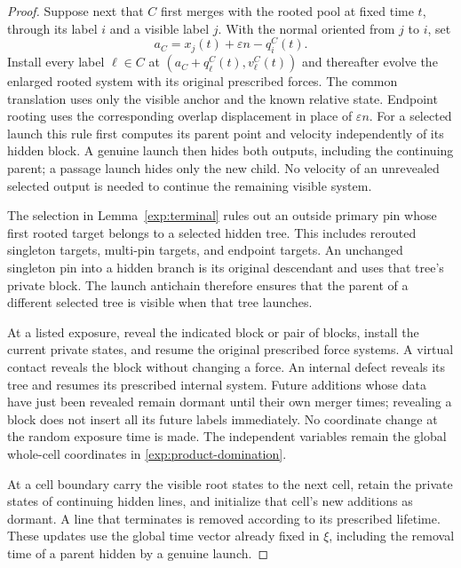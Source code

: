 \begin{proof}
Suppose next that $C$ first merges with the rooted pool at fixed time $t$,
through its label $i$ and a visible label $j$.  With the normal oriented
from $j$ to $i$, set
\begin{equation}
\label{exp:dormant-install}
 a_C=x_j(t)+\varepsilon n-q_i^C(t).
\end{equation}
Install every label $\ell\in C$ at
$(a_C+q_\ell^C(t),v_\ell^C(t))$ and thereafter evolve the enlarged rooted
system with its original prescribed forces.  The common translation uses
only the visible anchor and the known relative state.  Endpoint rooting
uses the corresponding overlap displacement in place of $\varepsilon n$.
For a selected launch this rule first computes its parent point and
velocity independently of its hidden block.  A genuine launch then hides
both outputs, including the continuing parent; a passage launch hides only
the new child.  No velocity of an unrevealed selected output is needed to
continue the remaining visible system.

The selection in Lemma~\ref{exp:terminal} rules out an outside primary pin
whose first rooted target belongs to a selected hidden tree.  This includes
rerouted singleton targets, multi-pin targets, and endpoint targets.  An
unchanged singleton pin into a hidden branch is its original descendant
and uses that tree's private block.  The launch antichain therefore ensures
that the parent of a different selected tree is visible when that tree
launches.

At a listed exposure, reveal the indicated block or pair of blocks,
install the current private states, and resume the original prescribed
force systems.  A virtual contact reveals the block without changing a
force.  An internal defect reveals its tree and resumes its prescribed
internal system.  Future additions whose data have just been revealed remain
dormant until their own merger times; revealing a block does not insert
all its future labels immediately.  No coordinate change at the random
exposure time is made.  The independent variables remain the global
whole-cell coordinates in \eqref{exp:product-domination}.

At a cell boundary carry
the visible root states to the next cell, retain the private states of
continuing hidden lines, and initialize that cell's new additions as
dormant.  A line that terminates is removed according to its prescribed
lifetime.  These updates use the global time vector already fixed in
$\xi$, including the removal time of a parent hidden by a genuine launch.


\end{proof}
